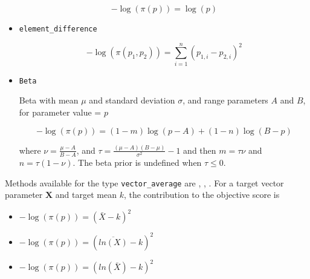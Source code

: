 \begin{itemize}
	\begin{equation}
	- \log \left(\pi \left(p \right) \right) = \log \left( p \right)
	\end{equation}

	\item\texttt{element\_difference}\label{sec:AdditionalPrior-ElementDifference}

	\begin{equation}
	- \log \left(\pi \left(p_1,p_2 \right) \right) = \sum_{i = 1}^n \left( p_{1,i} - p_{2,i} \right)^2
	\end{equation}

	\item\texttt{Beta}\label{sec:AdditionalPrior-Beta}

	{Beta with mean $\mu$ and standard deviation $\sigma$, and range parameters $A$ and $B$, for parameter value = $p$}

	\begin{equation}
	- \log \left(\pi \left( p \right) \right) = \left( 1 - m \right) \log \left( p - A \right) + \left( 1 - n \right)\log \left( B - p \right)
	\end{equation}

	where $\nu  = \frac{\mu  - A}{B - A}$, and $\tau = \frac{\left(\mu -A \right)\left(B - \mu \right)}{\sigma ^2} - 1$ and then $m=\tau \nu$ and $n=\tau(1-\nu)$. The beta prior is undefined when $\tau \leq 0$.
\end{itemize}

Methods available for the type \texttt{vector\_average} are , , . For a target vector parameter $\textbf{X}$ and target mean $k$, the contribution to the objective score is

\begin{itemize}
	\item {}

	$- \log \left(\pi \left(p \right) \right) = \left(\bar{X} - k\right)^2$

	\item {}

	$- \log \left(\pi \left(p \right) \right) = \left(\overline{ln\left(X\right)} - k\right)^2$

	\item {}

	$- \log \left(\pi \left(p \right) \right) = \left(ln\left(\bar{X}\right) - k\right)^2$
\end{itemize}

